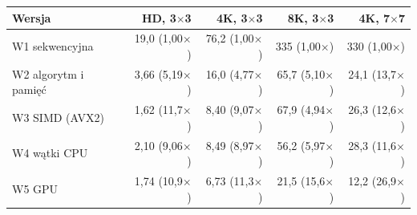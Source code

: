 \begin{tabular}{lrrrr}
\toprule
Wersja & HD, 3$\times$3 & 4K, 3$\times$3 & 8K, 3$\times$3 & 4K, 7$\times$7 \\
\midrule
W1 sekwencyjna & 19,0 (1,00$\times$) & 76,2 (1,00$\times$) & 335 (1,00$\times$) & 330 (1,00$\times$) \\
W2 algorytm i pamięć & 3,66 (5,19$\times$) & 16,0 (4,77$\times$) & 65,7 (5,10$\times$) & 24,1 (13,7$\times$) \\
W3 SIMD (AVX2) & 1,62 (11,7$\times$) & 8,40 (9,07$\times$) & 67,9 (4,94$\times$) & 26,3 (12,6$\times$) \\
W4 wątki CPU & 2,10 (9,06$\times$) & 8,49 (8,97$\times$) & 56,2 (5,97$\times$) & 28,3 (11,6$\times$) \\
W5 GPU & 1,74 (10,9$\times$) & 6,73 (11,3$\times$) & 21,5 (15,6$\times$) & 12,2 (26,9$\times$) \\
\bottomrule
\end{tabular}
